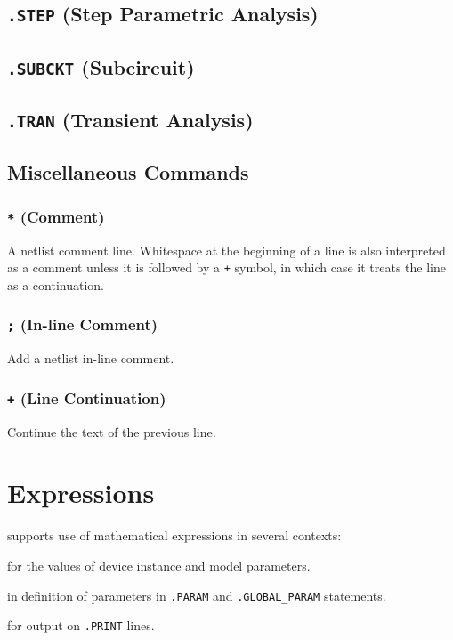\newpage
\subsection{\texttt{.STEP} (Step Parametric Analysis)}\label{.STEP}


\newpage
\subsection{\texttt{.SUBCKT} (Subcircuit)}
\label{SubcircuitDefinition}


\newpage
\subsection{\texttt{.TRAN} (Transient Analysis)}


\newpage
\subsection{Miscellaneous Commands}
\subsubsection{\texttt{*} (Comment)}
 A netlist comment line.  Whitespace at
the beginning of a line is also interpreted as a comment unless it
is followed by a \verb|+| symbol, in which case it treats the line as a continuation.

\subsubsection{\texttt{;} (In-line Comment)}
 Add a netlist in-line comment.

\subsubsection{\texttt{+} (Line Continuation)}
 Continue the text of the previous line.

\newpage
\section{Expressions}
\label{ExpressionDocumentation}
\Xyce{} supports use of mathematical expressions in several contexts:
\begin{XyceItemize}
\item for the values of device instance and model parameters.
\item in definition of parameters in \texttt{.PARAM} and \texttt{.GLOBAL\_PARAM} statements.
\item for output on \texttt{.PRINT} lines.
\end{XyceItemize}

